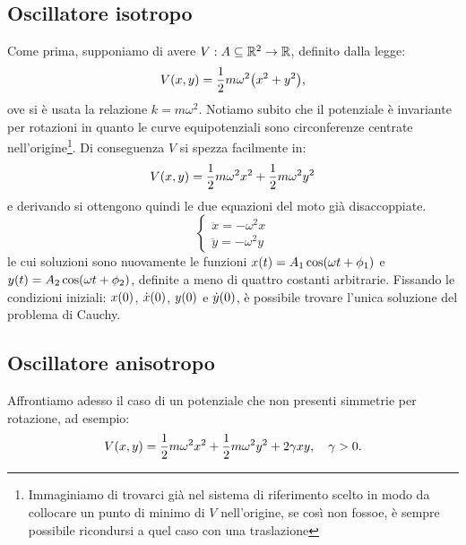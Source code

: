     \subsection{Oscillatore isotropo}
        Come prima, supponiamo di avere $V:A\subseteq{\mathbb{R}^2}\rightarrow\mathbb{R}$, definito dalla legge: $$V\qty(x,y)=\frac{1}{2}m\omega^2\qty(x^2+y^2),$$ ove si \`e usata la relazione $k=m\omega^2$. Notiamo subito che il potenziale \`e invariante per rotazioni in quanto le curve equipotenziali sono circonferenze centrate nell'origine\footnote{Immaginiamo di trovarci gi\`a nel sistema di riferimento scelto in modo da collocare un punto di minimo di $V$ nell'origine, se cos\`i non fossoe, \`e sempre possibile ricondursi a quel caso con una traslazione}. Di conseguenza $V$ si spezza facilmente in: $$V\qty(x,y)=\frac{1}{2}m\omega^2x^2+\frac{1}{2}m\omega^2y^2$$ e derivando si ottengono quindi le due equazioni del moto gi\`a disaccoppiate.
        \begin{equation*}
        \begin{cases}
            \ddot{x}=-\omega^2x\\
            \ddot{y}=-\omega^2y
        \end{cases}
        \end{equation*}
        le cui soluzioni sono nuovamente le funzioni $x\qty(t)=A_1\cos(\omega t+\phi_1)$ e $y\qty(t)=A_2\cos(\omega t+\phi_2)$, definite a meno di quattro costanti arbitrarie. Fissando le condizioni iniziali: $x\qty(0)$, $\dot{x}\qty(0)$, $y\qty(0)$ e $\dot{y}\qty(0)$, \`e possibile trovare l'unica soluzione del problema di Cauchy.
    \subsection{Oscillatore anisotropo}
        Affrontiamo adesso il caso di un potenziale che non presenti simmetrie per rotazione, ad esempio: $$V\qty(x,y)=\frac{1}{2}m\omega^2x^2+\frac{1}{2}m\omega^2y^2+2\gamma xy,\quad\gamma>0.$$
